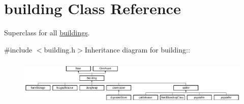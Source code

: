 \hypertarget{classbuilding}{
\section{building Class Reference}
\label{classbuilding}
}


Superclass for all \hyperlink{classbuildings}{buildings}.  


{\ttfamily \#include $<$building.h$>$}Inheritance diagram for building::\begin{figure}[H]
\begin{center}
\leavevmode
\includegraphics[height=2.22222cm]{classbuilding}
\end{center}
\end{figure}
